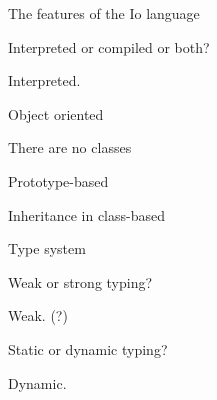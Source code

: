 \begin{frame}
  \begin{center}
    The features of the Io language
  \end{center}
\end{frame}

\begin{frame}
  \begin{center}
    Interpreted or compiled or both?
    
    Interpreted.
  \end{center}
\end{frame}

\begin{frame}
  \begin{center}
    Object oriented
  \end{center}
\end{frame}

\begin{frame}
  \begin{center}
    There are no classes
  \end{center}
\end{frame}

\begin{frame}
  \begin{center}
    Prototype-based
  \end{center}
\end{frame}

\begin{frame}
  \begin{center}
    Inheritance in class-based 
  \end{center}
\end{frame}

\begin{frame}
  \begin{center}
    Type system
  \end{center}
\end{frame}

\begin{frame}
  \begin{center}
    Weak or strong typing?
    
    Weak. (?)
  \end{center}
\end{frame}

\begin{frame}
  \begin{center}
    Static or dynamic typing?
    
    Dynamic.
  \end{center}
\end{frame}


